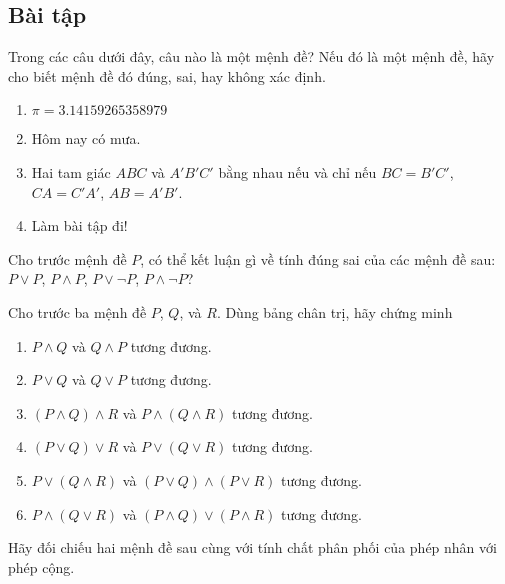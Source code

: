 \subsection*{Bài tập}
\setcounter{exercise}{0}

\begin{exercise}\label{propositional-logic:exercise1}
    Trong các câu dưới đây, câu nào là một mệnh đề? Nếu đó là một mệnh đề, hãy cho biết mệnh đề đó đúng, sai, hay không xác định.
    \begin{enumerate}[label={(\alph*)},itemsep=0pt]
        \item $\pi = 3.14159265358979$
        \item Hôm nay có mưa.
        \item Hai tam giác $ABC$ và $A'B'C'$ bằng nhau nếu và chỉ nếu $BC = B'C'$, $CA = C'A'$, $AB = A'B'$.
        \item Làm bài tập đi!
    \end{enumerate}
\end{exercise}

\begin{exercise}\label{propositional-logic:exercise2}
    Cho trước mệnh đề $P$, có thể kết luận gì về tính đúng sai của các mệnh đề sau: $P\vee P$, $P\wedge P$, $P\vee \neg P$, $P\wedge \neg P$?
\end{exercise}

\begin{exercise}\label{propositional-logic:exercise3}
    Cho trước ba mệnh đề $P$, $Q$, và $R$. Dùng bảng chân trị, hãy chứng minh
    \begin{enumerate}[label={(\alph*)},itemsep=0pt]
        \item $P\wedge Q$ và $Q\wedge P$ tương đương.
        \item $P\vee Q$ và $Q\vee P$ tương đương.
        \item $(P\wedge Q)\wedge R$ và $P\wedge (Q\wedge R)$ tương đương.
        \item $(P\vee Q)\vee R$ và $P\vee (Q\vee R)$ tương đương.
        \item $P\vee (Q\wedge R)$ và $(P\vee Q)\wedge (P\vee R)$ tương đương.
        \item $P\wedge (Q\vee R)$ và $(P\wedge Q)\vee (P\wedge R)$ tương đương.
    \end{enumerate}

    \noindent Hãy đối chiếu hai mệnh đề sau cùng với tính chất phân phối của phép nhân với phép cộng.
\end{exercise}

